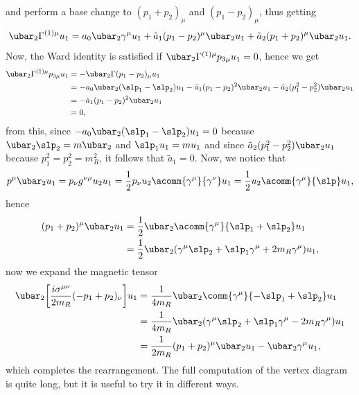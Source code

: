 and perform a base change to $(p_1 + p_2)_\mu$ and $(p_1 - p_2)_\mu$, thus getting
\begin{equation}
    \ubar_2\Gamma^{(1)\mu}u_1 = a_0\ubar_2\gamma^\mu u_1 + \tilde{a}_1(p_1 - p_2)^\mu\ubar_2u_1 + \tilde{a}_2(p_1 + p_2)^\mu\ubar_2u_1.
\end{equation}
Now, the Ward identity is satisfied if $\ubar_2\Gamma^{(1)\mu}p_{3\mu}u_1 = 0$, hence we get
\begin{equation}
    \begin{split}
        \ubar_2\Gamma^{(1)\mu}p_{3\mu}u_1 &= -\ubar_2\Gamma(p_1 - p_2)_\mu u_1 \\
        &= -a_0\ubar_2(\slp_1 - \slp_2)u_1 -\tilde{a}_1(p_1 - p_2)^2\ubar_2u_1 - \tilde{a}_2(p_1^2 - p_2^2)\ubar_2u_1 \\
        &= -\tilde{a}_1(p_1 - p_2)^2\ubar_2u_1 \\
        &= 0,
    \end{split}
\end{equation}
from this, since $-a_0\ubar_2(\slp_1 - \slp_2)u_1 = 0$ because $\ubar_2\slp_2 = m\ubar_2$ and $\slp_1u_1 = mu_1$ and since $\tilde{a}_2(p_1^2 - p_2^2)\ubar_2u_1$ because $p_1^2 = p_2^2 = m_R^2$, it follows that $\tilde{a}_1 = 0$. Now, we notice that
\begin{equation}
    p^\mu\ubar_2u_1 = p_\nu g^{\nu\mu}u_2u_1 = \frac{1}{2}p_\nu u_2\acomm{\gamma^\mu}{\gamma^\nu}u_1 = \frac{1}{2}u_2\acomm{\gamma^\mu}{\slp}u_1,
\end{equation}
hence
\begin{equation}
    \begin{split}
        (p_1 + p_2)^\mu\ubar_2u_1 &= \frac{1}{2}\ubar_2\acomm{\gamma^\mu}{\slp_1 + \slp_2}u_1 \\
        &= \frac{1}{2}\ubar_2(\gamma^\mu\slp_2 + \slp_1\gamma^\mu + 2m_R\gamma^\mu)u_1,
    \end{split}
\end{equation}
now we expand the magnetic tensor
\begin{equation}
    \begin{split}
        \ubar_2\bigg[\frac{i\sigma^{\mu\nu}}{2m_R}(-p_1 + p_2)_\nu \bigg]u_1 &= \frac{1}{4m_R}\ubar_2\comm{\gamma^\mu}{-\slp_1 + \slp_2}u_1 \\
        &= \frac{1}{4m_R}\ubar_2(\gamma^\mu\slp_2 + \slp_1\gamma^\mu - 2m_R\gamma^\mu)u_1 \\
        &= \frac{1}{2m_R}(p_1 + p_2)^\mu\ubar_2u_1 - \ubar_2\gamma^\mu u_1,
    \end{split}
\end{equation}
which completes the rearrangement. The full computation of the vertex diagram is quite long, but it is useful to try it in different ways.

